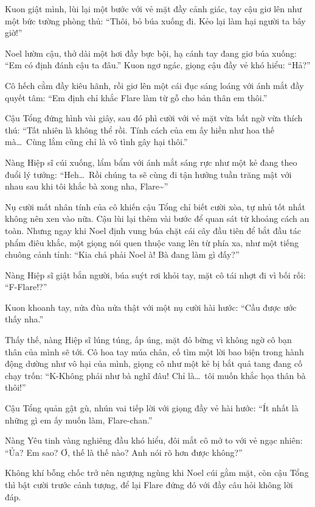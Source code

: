 \documentclass[../main.tex]{subfiles}
\begin{document}
Kuon giật mình, lùi lại một bước với vẻ mặt đầy cảnh giác, tay cậu giơ lên như một bức tường phòng thủ: ``Thôi, bỏ búa xuống đi. Kẻo lại làm hại người ta bây giờ!''

Noel lườm cậu, thở dài một hơi đầy bực bội, hạ cánh tay đang giơ búa xuống: ``Em có định đánh cậu ta đâu.'' Kuon ngơ ngác, giọng cậu đầy vẻ khó hiểu: ``Hả?''

Cô hếch cằm đầy kiêu hãnh, rồi giơ lên một cái đục sáng loáng với ánh mắt đầy quyết tâm: ``Em định chỉ khắc Flare làm từ gỗ cho bản thân em thôi.''

Cậu Tổng đứng hình vài giây, sau đó phì cười với vẻ mặt vừa bất ngờ vừa thích thú: ``Tất nhiên là không thể rồi. Tính cách của em ấy hiền như hoa thế mà\dots\ Cùng lắm cũng chỉ là vô tình gây hại thôi.''

Nàng Hiệp sĩ cúi xuống, lẩm bẩm với ánh mắt sáng rực như một kẻ đang theo đuổi lý tưởng: ``Heh\dots\ Rồi chúng ta sẽ cùng đi tận hưởng tuần trăng mật với nhau sau khi tôi khắc bà xong nha, Flare\~{}''

Nụ cười mất nhân tính của cô khiến cậu Tổng chỉ biết cười xòa, tự nhủ tốt nhất không nên xen vào nữa. Cậu lùi lại thêm vài bước để quan sát từ khoảng cách an toàn. Nhưng ngay khi Noel định vung búa chặt cái cây đầu tiên để bắt đầu tác phẩm điêu khắc, một giọng nói quen thuộc vang lên từ phía xa, như một tiếng chuông cảnh tỉnh: ``Kia chả phải Noel à! Bà đang làm gì đấy?''

Nàng Hiệp sĩ giật bắn người, búa suýt rơi khỏi tay, mặt cô tái nhợt đi vì bối rối: ``F-Flare!?''


Kuon khoanh tay, nửa đùa nửa thật với một nụ cười hài hước: ``Cầu được ước thấy nha.''

Thấy thế, nàng Hiệp sĩ lúng túng, ấp úng, mặt đỏ bừng vì không ngờ cô bạn thân của mình sẽ tới. Cô hoa tay múa chân, cố tìm một lời bao biện trong hành động dường như vô hại của mình, giọng cô như một kẻ bị bắt quả tang đang cố chạy trốn: ``K-Không phải như bà nghĩ đâu! Chỉ là\dots\ tôi muốn khắc họa thân bà thôi!''


Cậu Tổng quản gật gù, nhún vai tiếp lời với giọng đầy vẻ hài hước: ``Ít nhất là những gì em ấy muốn làm, Flare-chan.''

Nàng Yêu tinh vàng nghiêng đầu khó hiểu, đôi mắt cô mở to với vẻ ngạc nhiên: ``Ủa? Em sao? Ơ, thế là thế nào? Anh nói rõ hơn được không?''

Không khí bỗng chốc trở nên ngượng ngùng khi Noel cúi gằm mặt, còn cậu Tổng thì bật cười trước cảnh tượng, để lại Flare đứng đó với đầy câu hỏi không lời đáp.
\end{document}
